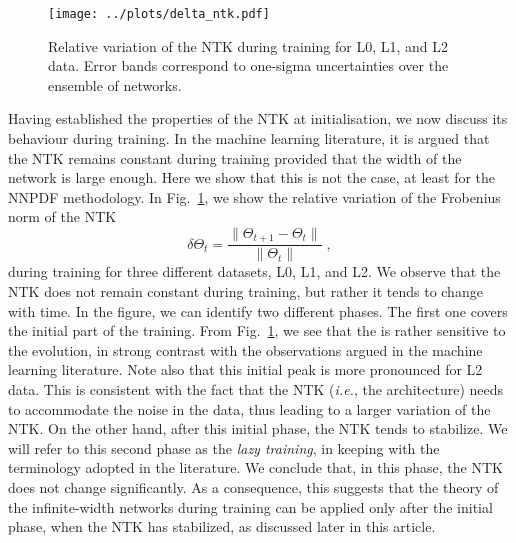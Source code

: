 \begin{figure}[h!]
  \centering
  \texttt{[image: ../plots/delta\_ntk.pdf]}
  \caption{Relative variation of the NTK during training for L0, L1, and L2 data. Error
  bands correspond to one-sigma uncertainties over the ensemble of networks.}
  \label{fig:NTKTime}
\end{figure}
Having established the properties of the NTK at initialisation, we now discuss
its behaviour during training. In the machine learning literature, it is argued
that the NTK remains constant during training provided that the width of the
network is large enough. Here we show that this is not the case, at least for
the NNPDF methodology. In Fig.~\ref{fig:NTKTime}, we show the relative variation
of the Frobenius norm of the NTK
\begin{equation}
\delta \Theta_t = \frac{\lVert \Theta_{t+1} - \Theta_t \rVert}{\lVert \Theta_t \rVert} \;,
\label{eq:DeltaNTK}
\end{equation}
during training for three different datasets, L0, L1,
and L2. We observe that the NTK does not remain constant during training, but
rather it tends to change with time. In the figure, we can identify two
different phases. The first one covers the initial part of the training. From
Fig.~\ref{fig:NTKTime}, we see that the is rather sensitive to the evolution, in
strong contrast with the observations argued in the machine learning literature.
Note also that this initial peak is more pronounced for L2 data. This is
consistent with the fact that the NTK (\textit{i.e.}, the architecture) needs to
accommodate the noise in the data, thus leading to a larger variation of the
NTK. On the other hand, after this initial phase, the NTK tends to stabilize. We
will refer to this second phase as the \textit{lazy training}, in keeping with
the terminology adopted in the literature. We conclude that, in this phase, the
NTK does not change significantly. As a consequence, this suggests that the
theory of the infinite-width networks during training can be applied only after
the initial phase, when the NTK has stabilized, as discussed later in this
article.

